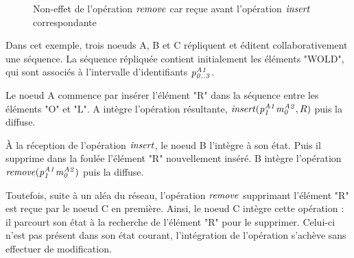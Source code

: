 \begin{figure}[!ht]
{
  }
  \caption{Non-effet de l'opération $\mathit{remove}$ car reçue avant l'opération $\mathit{insert}$ correspondante}
  \label{fig:why-causal-remove}
\end{figure}

Dans cet exemple, trois noeuds A, B et C répliquent et éditent collaborativement une séquence.
La séquence répliquée contient initialement les éléments "WOLD", qui sont associés à l'intervalle d'identifiants $\mathit{p}^{\mathit{A1}}_{\mathit{0..3}}$.

Le noeud A commence par insérer l'élément "R" dans la séquence entre les éléments "O" et "L".
A intègre l'opération résultante, $\mathit{insert}(\mathit{p}^{\mathit{A1}}_{\mathit{1}}\mathit{m}^{\mathit{A2}}_{\mathit{0}},R)$ puis la diffuse.

À la réception de l'opération $\mathit{insert}$, le noeud B l'intègre à son état.
Puis il supprime dans la foulée l'élément "R" nouvellement inséré.
B intègre l'opération $\mathit{remove}(\mathit{p}^{\mathit{A1}}_{\mathit{1}}\mathit{m}^{\mathit{A2}}_{\mathit{0}})$ puis la diffuse.

Toutefois, suite à un aléa du réseau, l'opération $\mathit{remove}$ supprimant l'élément "R" est reçue par le noeud C en première.
Ainsi, le noeud C intègre cette opération : il parcourt son état à la recherche de l'élément "R" pour le supprimer.
Celui-ci n'est pas présent dans son état courant, l'intégration de l'opération s'achève sans effectuer de modification.

